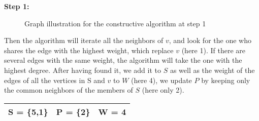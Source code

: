     \vspace{1\baselineskip}

    \begin{minipage}{\linewidth}
        \textbf{Step 1:} \newline
        \begin{minipage}{0.4\textwidth}
            \begin{figure}[H]
                \centering
                \caption{Graph illustration for the constructive algorithm at step 1}
                \label{fig:constructive-mewc-edge}
            \end{figure}
        \end{minipage}
        \begin{minipage}{0.6\textwidth}
            Then the algorithm will iterate all the neighbors of $v$, and look for the one who shares the edge with the highest weight, which replace $v$ (here 1). If there are several edges with the same weight, the algorithm will take the one with the highest degree. After having found it, we add it to $S$ as well as the weight of the edges of all the vertices in S and $v$ to $W$ (here 4), we update $P$ by keeping only the common neighbors of the members of $S$ (here only 2).
    
            \begin{center}
                \begin{tabular}{|lll|}
                    \hline
                    S = \{5,1\} & P = \{2\} & W = 4 \\
                    \hline
                \end{tabular}
            \end{center}
        \end{minipage}
    \end{minipage} 

